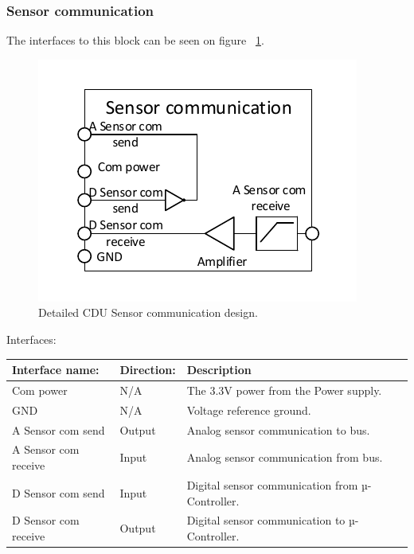 \subsubsection{Sensor communication}
The interfaces to this block can be seen on figure ~\ref{fig:CDUSC}.\\
\begin{figure}[H]
	\centering
	\includegraphics[scale=1]{billeder/CDUSC}
	\caption{Detailed CDU Sensor communication design.}
	\label{fig:CDUSC}
\end{figure}
Interfaces:
\begin{table}[H]
	\centering
	\begin{tabular}{|p{3cm} |p{3cm}| p{8cm}| }
		\hline
		Interface name: & Direction: 	& Description \\ \hline
		Com power	  &N/A & The 3.3V power from the Power supply. \\ \hline
		GND				&N/A & Voltage reference ground. \\\hline 
		A Sensor com send	&Output & Analog sensor communication to bus. \\\hline 
		A Sensor com receive &Input	& Analog sensor communication from bus. \\\hline
		D Sensor com send & Input	& Digital sensor communication from µ-Controller. \\\hline 
		D Sensor com receive &Output	& Digital sensor communication to µ-Controller. \\\hline
	\end{tabular}
\end{table}


